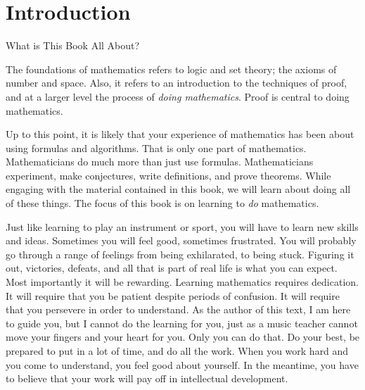 \chapter{Introduction}\label{chap:intro}

\begin{section}{What is This Book All About?}%

The foundations of mathematics refers to logic and set theory; the axioms of number and space.  Also, it refers to an introduction to the techniques of proof, and at a larger level the process of \emph{doing mathematics}.  Proof is central to doing mathematics.

Up to this point, it is likely that your experience of mathematics has been about using formulas and algorithms. That is only one part of mathematics. Mathematicians do much more than just use formulas.  Mathematicians experiment, make conjectures, write definitions, and prove theorems.  While engaging with the material contained in this book, we will learn about doing all of these things. The focus of this book is on learning to \emph{do} mathematics. 

Just like learning to play an instrument or sport, you will have to learn new skills and ideas.  Sometimes you will feel good, sometimes frustrated.  You will probably go through a range of feelings from being exhilarated, to being stuck.  Figuring it out, victories, defeats, and all that is part of real life is what you can expect.  Most importantly it will be rewarding.  Learning mathematics requires dedication.  It will require that you be patient despite periods of confusion.  It will require that you persevere in order to understand.  As the author of this text, I am here to guide you, but I cannot do the learning for you, just as a music teacher cannot move your fingers and your heart for you.  Only you can do that.  
Do your best, be prepared to put in a lot of time, and do all the work. 
When you work hard and you come to understand, you feel good about yourself.  In the meantime, you have to believe that your work will pay off in intellectual development.



\end{section}
